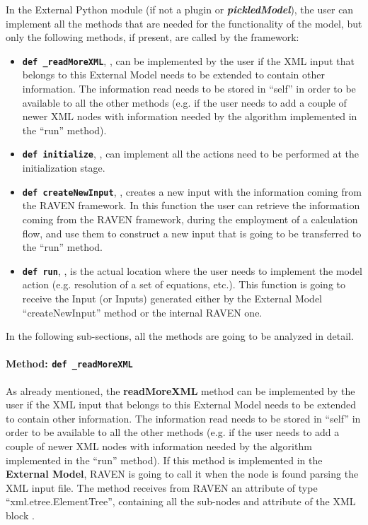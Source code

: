 In the External Python module (if not a plugin or  \textbf{\textit{pickledModel}}), the user can implement all the methods that are
needed for the functionality of the model, but only the following methods, if
present, are called by the framework:
\begin{itemize}
  \item \texttt{\textbf{def \_readMoreXML}}, , can be
  implemented by the user if the XML input that belongs to this External Model
  needs to be extended to contain other information.
  The information read needs to be stored in ``self'' in order to be available
  to all the other methods (e.g. if the user needs to add a couple of newer XML
  nodes with information needed by the algorithm implemented in the ``run''
  method).
  \item \texttt{\textbf{def initialize}}, , can
  implement all the actions need to be performed at the initialization stage.
  \item \texttt{\textbf{def createNewInput}}, , creates
  a new input with the information coming from the RAVEN framework.
  In this function the user can retrieve the information coming from the RAVEN
  framework, during the employment of a calculation flow, and use them to
  construct a new input that is going to be transferred to the ``run'' method.
  \item \texttt{\textbf{def run}}, , is the actual
  location where the user needs to implement the model action (e.g. resolution
  of a set of equations, etc.).
  This function is going to receive the Input (or Inputs) generated either by
  the External Model ``createNewInput'' method or the internal RAVEN one.
\end{itemize}

In the following sub-sections, all the methods are going to be analyzed in
detail.

\paragraph{Method: \texttt{def \_readMoreXML}}
\label{subsubsubsec:externalReadMoreXML}
As already mentioned, the \textbf{readMoreXML} method can be implemented by the
user if the XML input that belongs to this External Model needs to be extended
to contain other information.
%
The information read needs to be stored in ``self'' in order to be available to
all the other methods (e.g. if the user needs to add a couple of newer XML nodes
with information needed by the algorithm implemented in the ``run'' method).
%
If this method is implemented in the \textbf{External Model}, RAVEN is going to
call it when the node  is found parsing the XML input
file.
%
The method receives from RAVEN an attribute of type ``xml.etree.ElementTree'',
containing all the sub-nodes and attribute of the XML block .
%

